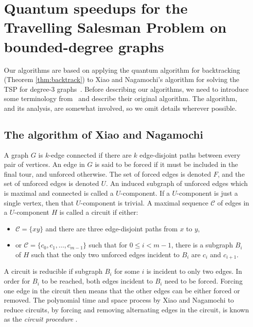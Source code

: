 
\section{Quantum speedups for the Travelling Salesman Problem on bounded-degree graphs \label{sec:bd}}
\label{sec:deg3}

Our algorithms are based on applying the quantum algorithm for backtracking (Theorem \ref{thm:backtrack}) to Xiao and Nagamochi's algorithm for solving the TSP for degree-3 graphs~\cite{xiao2016degree3}. Before describing our algorithms, we need to introduce some terminology from~\cite{xiao2016degree3} and describe their original algorithm. The algorithm, and its analysis, are somewhat involved, so we omit details wherever possible.

\subsection{The algorithm of Xiao and Nagamochi}
\label{sec:xndeg3}

A graph $G$ is $k$-edge connected if there are $k$ edge-disjoint paths between every pair of vertices. An edge in $G$ is said to be forced if it must be included in the final tour, and unforced otherwise. The set of forced edges is denoted $F$, and the set of unforced edges is denoted $U$. An induced subgraph of unforced edges which is maximal and connected is called a $U$-component. If a $U$-component is just a single vertex, then that $U$-component is trivial. A maximal sequence $\mathcal{C}$ of edges in a $U$-component $H$ is called a circuit if either:
%
\begin{itemize}
\item $\mathcal{C} = \{xy\}$ and there are three edge-disjoint paths from $x$ to $y$,
\item or $\mathcal{C} = \{c_0, c_1,\dots,c_{m-1}\}$ such that for $0 \leq i < m-1$, there is a subgraph $B_i$ of $H$ such that the only two unforced edges incident to $B_i$ are $c_i$ and $c_{i+1}$.
\end{itemize}
%

A circuit is reducible if subgraph $B_i$ for some $i$ is incident to only two edges. In order for $B_i$ to be reached, both edges incident to $B_i$ need to be forced. Forcing one edge in the circuit then means that the other edges can be either forced or removed. The polynomial time and space process by Xiao and Nagamochi to reduce circuits, by forcing and removing alternating edges in the circuit, is known as the {\em circuit procedure} \cite{xiao2016degree3}.

